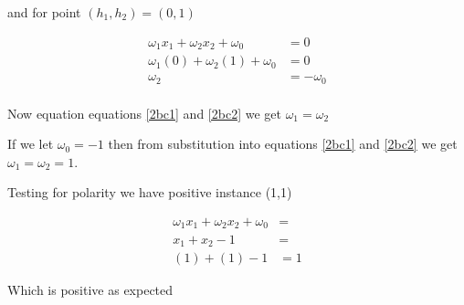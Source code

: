 \documentclass[10pt,a4paper]{article}
\begin{document}
and for point $(h_1,h_2) = (0,1)$

\begin{equation}
\label{2bc2}
\begin{split}
\omega_1 x_1 + \omega_2 x_2 + \omega_0 &= 0 \\
\omega_1(0) + \omega_2(1) + \omega_0 &= 0 \\
\omega_2 &= -\omega_0\\
\end{split}
\end{equation}

Now equation equations \ref{2bc1} and \ref{2bc2} we get $\omega_1 = \omega_2$

If we let $\omega_0 = -1$ then from substitution into equations \ref{2bc1} and \ref{2bc2} we get $\omega_1=\omega_2=1$.

Testing for polarity we have positive instance (1,1) 

\begin{equation}
\begin{split}
\omega_1 x_1 + \omega_2 x_2 + \omega_0 &= \\
x_1 + x_2 -1 &= \\
(1) + (1) - 1 &= 1
\end{split}
\end{equation}

Which is positive as expected
\end{document}
